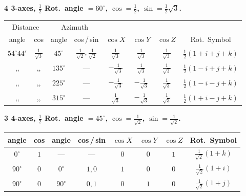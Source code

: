\documentclass[11pt]{article}
\begin{document}
\noindent\textbf{4 3-axes, $\tfrac{1}{2}$ Rot.~angle $= 60^\circ$, $\cos = \tfrac{1}{2}$, $\sin = \tfrac{1}{2}\sqrt{3}$.}
\begin{center}
\begin{tabular}{|c|c|c|c|c|c|c|c|}\hline
\multicolumn{2}{|c|}{Distance} & \multicolumn{2}{c|}{Azimuth} & & & & \\
angle & cos & angle & cos\,/\,sin & $\cos X$ & $\cos Y$ & $\cos Z$ & Rot.~Symbol \\\hline
$54^\circ 44'$ & $\tfrac{1}{\sqrt{3}}$ & $45^\circ$ & $\tfrac{1}{\sqrt{2}},\tfrac{1}{\sqrt{2}}$ & $\tfrac{1}{\sqrt{3}}$ & $\tfrac{1}{\sqrt{3}}$ & $\tfrac{1}{\sqrt{3}}$ & $\tfrac{1}{2}(1 + i + j + k)$ \\
,, & ,, & $135^\circ$ & --- & $-\tfrac{1}{\sqrt{3}}$ & $\tfrac{1}{\sqrt{3}}$ & $\tfrac{1}{\sqrt{3}}$ & $\tfrac{1}{2}(1 - i + j + k)$ \\
,, & ,, & $225^\circ$ & --- & $-\tfrac{1}{\sqrt{3}}$ & $-\tfrac{1}{\sqrt{3}}$ & $\tfrac{1}{\sqrt{3}}$ & $\tfrac{1}{2}(1 - i - j + k)$ \\
,, & ,, & $315^\circ$ & --- & $\tfrac{1}{\sqrt{3}}$ & $-\tfrac{1}{\sqrt{3}}$ & $\tfrac{1}{\sqrt{3}}$ & $\tfrac{1}{2}(1 + i - j + k)$ \\\hline
\end{tabular}
\end{center}

\medskip
\noindent\textbf{3 4-axes, $\tfrac{1}{2}$ Rot.~angle $= 45^\circ$, $\cos = \tfrac{1}{\sqrt{2}}$, $\sin = \tfrac{1}{\sqrt{2}}$.}
\begin{center}
\begin{tabular}{|c|c|c|c|c|c|c|c|}\hline
angle & cos & angle & cos\,/\,sin & $\cos X$ & $\cos Y$ & $\cos Z$ & Rot.~Symbol \\\hline
$0^\circ$ & $1$ & --- & --- & $0$ & $0$ & $1$ & $\tfrac{1}{\sqrt{2}}(1 + k)$ \\
$90^\circ$ & $0$ & $0^\circ$ & $1,0$ & $1$ & $0$ & $0$ & $\tfrac{1}{\sqrt{2}}(1 + i)$ \\
$90^\circ$ & $0$ & $90^\circ$ & $0,1$ & $0$ & $1$ & $0$ & $\tfrac{1}{\sqrt{2}}(1 + j)$ \\\hline
\end{tabular}
\end{center}
\end{document}
